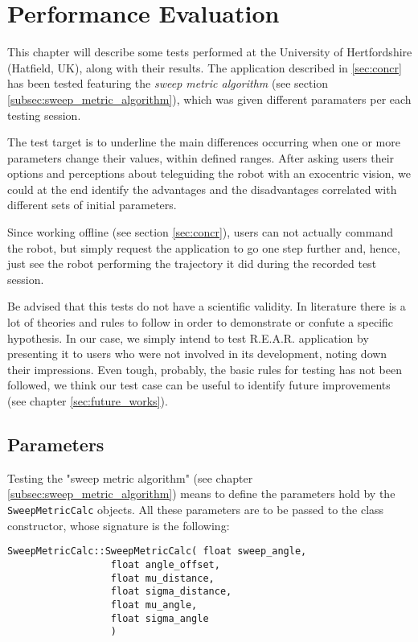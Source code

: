 \section{Performance Evaluation}
\label{sec:performance_evaluation}

This chapter will describe some tests performed at the University of Hertfordshire
(Hatfield, UK), along with their results. 
%
The application described in \ref{sec:concr} has been tested 
featuring the \textit{sweep metric algorithm} (see section 
\ref{subsec:sweep_metric_algorithm}), which was 
given different paramaters per each testing session.
%

%
The test target is to underline the main differences 
occurring when one or more parameters change their values, 
within defined ranges. After asking users their options and perceptions
about teleguiding the robot with an exocentric vision, we could at the end identify the advantages
and the disadvantages correlated with different sets of initial parameters.
%

%
Since working offline (see section \ref{sec:concr}), users can not actually 
command the robot, but simply request the application to go one step
further and, hence, just see the robot performing the trajectory 
it did during the recorded test session.
%

%
Be advised that this tests do not have a scientific validity. In literature there is a lot of theories
and rules to follow in order to demonstrate or confute a specific hypothesis. In our case, we simply
intend to test R.E.A.R. application by presenting it to users who were not involved in its development,
noting down their impressions. Even tough, probably, the basic rules for testing has not been followed,
we think our test case can be useful to identify future improvements (see chapter \ref{sec:future_works}).

\subsection{Parameters}
\label{subsec:parameters}

Testing the "sweep metric algorithm" (see chapter \ref{subsec:sweep_metric_algorithm}) means to define
the parameters hold by the \texttt{SweepMetricCalc} objects. All these parameters are 
to be passed to the class constructor, whose signature is the following:
\\
%
\begin{verbatim}
SweepMetricCalc::SweepMetricCalc( float sweep_angle,
				  float angle_offset,
				  float mu_distance,
				  float sigma_distance,
				  float mu_angle,
				  float sigma_angle
				  )
\end{verbatim}
%

